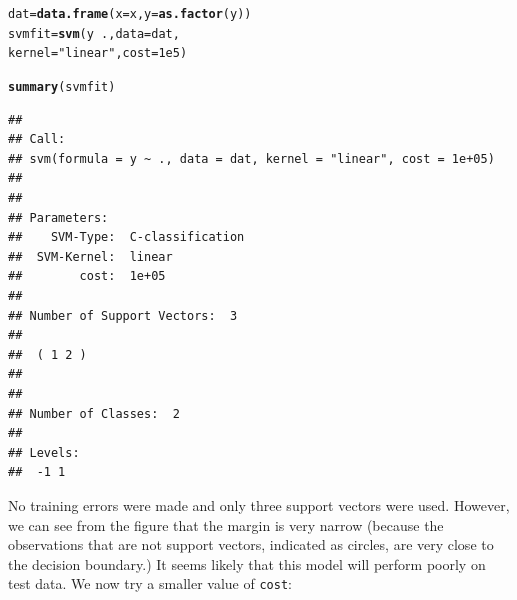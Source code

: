 \documentclass[12pt]{article}\usepackage[]{graphicx}\usepackage[]{color}
\makeatletter
\newcommand{\hlnum}[1]{\textcolor[rgb]{0.686,0.059,0.569}{#1}}%
\newcommand{\hlstr}[1]{\textcolor[rgb]{0.192,0.494,0.8}{#1}}%
\newcommand{\hlopt}[1]{\textcolor[rgb]{0,0,0}{#1}}%
\newcommand{\hlstd}[1]{\textcolor[rgb]{0.345,0.345,0.345}{#1}}%
\newcommand{\hlkwb}[1]{\textcolor[rgb]{0.69,0.353,0.396}{#1}}%
\newcommand{\hlkwc}[1]{\textcolor[rgb]{0.333,0.667,0.333}{#1}}%
\newcommand{\hlkwd}[1]{\textcolor[rgb]{0.737,0.353,0.396}{\textbf{#1}}}%
\newenvironment{kframe}{%
 \def\at@end@of@kframe{}%
 \ifinner\ifhmode%
  \def\at@end@of@kframe{\end{minipage}}%
  \begin{minipage}{\columnwidth}%
 \fi\fi%
 \def\FrameCommand##1{\hskip\@totalleftmargin \hskip-\fboxsep
 \colorbox{shadecolor}{##1}\hskip-\fboxsep
     \hskip-\linewidth \hskip-\@totalleftmargin \hskip\columnwidth}%
 \MakeFramed {\advance\hsize-\width
   \@totalleftmargin\z@ \linewidth\hsize
   \@setminipage}}%
 {\par\unskip\endMakeFramed%
 \at@end@of@kframe}
\newenvironment{knitrout}{}{} %
\makeatother
\begin{document}
\begin{knitrout}
\color{fgcolor}\begin{kframe}
\begin{alltt}
\hlstd{dat} \hlkwb{=} \hlkwd{data.frame}\hlstd{(}\hlkwc{x}\hlstd{=x,} \hlkwc{y}\hlstd{=}\hlkwd{as.factor}\hlstd{(y))}
\hlstd{svmfit}\hlkwb{=} \hlkwd{svm}\hlstd{(y}\hlopt{~}\hlstd{.,} \hlkwc{data} \hlstd{= dat,}
            \hlkwc{kernel} \hlstd{=} \hlstr{"linear"}\hlstd{,} \hlkwc{cost} \hlstd{=}\hlnum{1e5}\hlstd{)}

\hlkwd{summary}\hlstd{(svmfit)}
\end{alltt}
\begin{verbatim}
## 
## Call:
## svm(formula = y ~ ., data = dat, kernel = "linear", cost = 1e+05)
## 
## 
## Parameters:
##    SVM-Type:  C-classification 
##  SVM-Kernel:  linear 
##        cost:  1e+05 
## 
## Number of Support Vectors:  3
## 
##  ( 1 2 )
## 
## 
## Number of Classes:  2 
## 
## Levels: 
##  -1 1
\end{verbatim}
\end{kframe}
\end{knitrout}

No training errors were made and only three support vectors were used. However, we can see from the figure that the margin is very narrow (because the observations that are not support vectors, indicated as circles, are very close to the decision boundary.) It seems likely that this model will perform poorly on test data. We now try a smaller value of \texttt{cost}:
\end{document}
